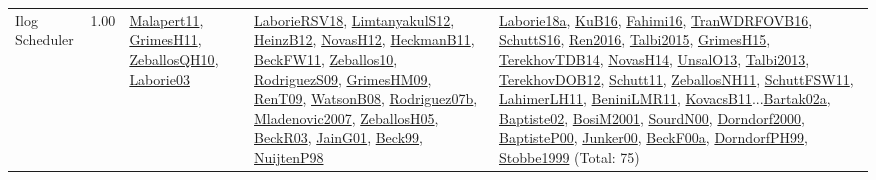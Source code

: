 {\begin{longtable}{p{3cm}r>{\raggedright\arraybackslash}p{6cm}>{\raggedright\arraybackslash}p{6cm}>{\raggedright\arraybackslash}p{8cm}}
\index{Ilog Scheduler}\index{CPSystems!Ilog Scheduler}Ilog Scheduler &  1.00 & \hyperref[detail:Malapert11]{Malapert11}, \hyperref[detail:GrimesH11]{GrimesH11}, \hyperref[detail:ZeballosQH10]{ZeballosQH10}, \hyperref[detail:Laborie03]{Laborie03} & \hyperref[detail:LaborieRSV18]{LaborieRSV18}, \hyperref[detail:LimtanyakulS12]{LimtanyakulS12}, \hyperref[detail:HeinzB12]{HeinzB12}, \hyperref[detail:NovasH12]{NovasH12}, \hyperref[detail:HeckmanB11]{HeckmanB11}, \hyperref[detail:BeckFW11]{BeckFW11}, \hyperref[detail:Zeballos10]{Zeballos10}, \hyperref[detail:RodriguezS09]{RodriguezS09}, \hyperref[detail:GrimesHM09]{GrimesHM09}, \hyperref[detail:RenT09]{RenT09}, \hyperref[detail:WatsonB08]{WatsonB08}, \hyperref[detail:Rodriguez07b]{Rodriguez07b}, \hyperref[detail:Mladenovic2007]{Mladenovic2007}, \hyperref[detail:ZeballosH05]{ZeballosH05}, \hyperref[detail:BeckR03]{BeckR03}, \hyperref[detail:JainG01]{JainG01}, \hyperref[detail:Beck99]{Beck99}, \hyperref[detail:NuijtenP98]{NuijtenP98} & \hyperref[detail:Laborie18a]{Laborie18a}, \hyperref[detail:KuB16]{KuB16}, \hyperref[detail:Fahimi16]{Fahimi16}, \hyperref[detail:TranWDRFOVB16]{TranWDRFOVB16}, \hyperref[detail:SchuttS16]{SchuttS16}, \hyperref[detail:Ren2016]{Ren2016}, \hyperref[detail:Talbi2015]{Talbi2015}, \hyperref[detail:GrimesH15]{GrimesH15}, \hyperref[detail:TerekhovTDB14]{TerekhovTDB14}, \hyperref[detail:NovasH14]{NovasH14}, \hyperref[detail:UnsalO13]{UnsalO13}, \hyperref[detail:Talbi2013]{Talbi2013}, \hyperref[detail:TerekhovDOB12]{TerekhovDOB12}, \hyperref[detail:Schutt11]{Schutt11}, \hyperref[detail:ZeballosNH11]{ZeballosNH11}, \hyperref[detail:SchuttFSW11]{SchuttFSW11}, \hyperref[detail:LahimerLH11]{LahimerLH11}, \hyperref[detail:BeniniLMR11]{BeniniLMR11}, \hyperref[detail:KovacsB11]{KovacsB11}...\hyperref[detail:Bartak02a]{Bartak02a}, \hyperref[detail:Baptiste02]{Baptiste02}, \hyperref[detail:BosiM2001]{BosiM2001}, \hyperref[detail:SourdN00]{SourdN00}, \hyperref[detail:Dorndorf2000]{Dorndorf2000}, \hyperref[detail:BaptisteP00]{BaptisteP00}, \hyperref[detail:Junker00]{Junker00}, \hyperref[detail:BeckF00a]{BeckF00a}, \hyperref[detail:DorndorfPH99]{DorndorfPH99}, \hyperref[detail:Stobbe1999]{Stobbe1999} (Total: 75)\\

\end{longtable}}
